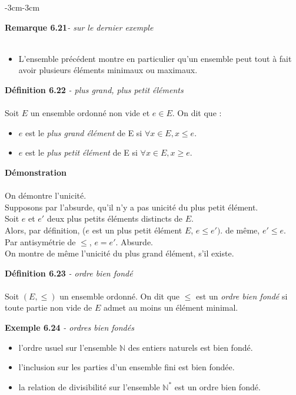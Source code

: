 \documentclass{article}
\newcommand{\notion}[1]{\textcolor{vert_fonce}{\textit{#1}}}
\newenvironment{definition}[2]
{
    \begin{boite_definition}
    \textbf{\textcolor{rouge_fonce}{Définition #1}} \textit{#2} \\ \\
}
{
    \end{boite_definition}
    \vspace{15pt}
}
\newenvironment{exemple}[2]
{
    \begin{boite_exemple}
    \textbf{\textcolor{bleu_fonce}{Exemple #1}} \textit{#2} \\
    \begin{itemize}[label=$\blacktriangleright \quad $]                    
}
{   
    \end{itemize}
    \end{boite_exemple}
    \vspace{15pt}
}
\newenvironment{demonstration}
{
    \begin{boite_demonstration}
    \textbf{\textcolor{rouge_fonce}{Démonstration}}\\ \\
}
{
    \end{boite_demonstration}
    \vspace{15pt}
}
\newenvironment{remarque}[2]
{
    \begin{boite_remarque}
    \textbf{\textcolor{bleu_fonce}{Remarque #1}}\textit{#2} \\ \\
    \begin{itemize}[label=$\blacktriangleright \quad $ ]                    
}
{   
    \end{itemize}
    \end{boite_remarque}
    
}
\begin{document}
\begin{adjustwidth}{-3cm}{-3cm}
\begin{remarque}{6.21}{- sur le dernier exemple}
    \item L'ensemble précédent montre en particulier qu'un ensemble peut tout à fait avoir plusieurs éléments minimaux ou maximaux.
\end{remarque}

\begin{definition}{6.22}{- plus grand, plus petit éléments}
    Soit $E$ un ensemble ordonné non vide et $e\in E$. On dit que :
    \begin{itemize}
        \item $e$ est le \notion{plus grand élément} de E si $\forall x \in E, x \leq e$.
        \item $e$ est le \notion{plus petit élément} de E si $\forall x \in E, x \geq e$.
    \end{itemize}
\end{definition}


\begin{demonstration}
    On démontre l'unicité.\\
    Supposons par l'absurde, qu'il n'y a pas unicité du plus petit élément. \\
    Soit $e$ et $e'$ deux plus petits éléments distincts de $E$. \\
    Alors, par définition, ($e$ est un plus petit élément $E$, $e \leq e')$. de même, $e' \leq e$. \\
    Par antisymétrie de $\leq$, $e=e'$. Absurde.\\
    On montre de même l'unicité du plus grand élément, s'il existe.
\end{demonstration}


\begin{definition}{6.23}{- ordre bien fondé}
    Soit $(E,\leq)$ un ensemble ordonné.
    On dit que $\leq$ est un \notion{ordre bien fondé} si toute partie non vide de $E$ admet au moins un élément minimal.
\end{definition}

\begin{exemple}{6.24}{- ordres bien fondés}
    \item l'ordre usuel sur l'ensemble $\mathbb{N}$ des entiers naturels est bien fondé.
    \item l'inclusion sur les parties d'un ensemble fini est bien fondée.
    \item la relation de divisibilité sur l'ensemble $\mathbb{N}^*$ est un ordre bien fondé.
\end{exemple}


\end{adjustwidth}
\end{document}
